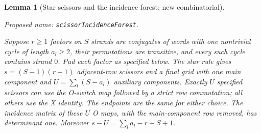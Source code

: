 \documentclass[11pt,a4paper]{article}
\newtheorem{lemma}[theorem]{Lemma}
\theoremstyle{remark}
\newcommand{\formalname}[1]{\leavevmode\par\noindent\textnormal{\small Proposed name: \texttt{#1}.}\par\smallskip}
\begin{document}
\begin{lemma}[Star scissors and the incidence forest; new combinatorial]
\label{lem:scissor-forest}
\formalname{scissorIncidenceForest}
Suppose $r\ge1$ factors on $S$ strands are conjugates of words with
one nontrivial cycle of length $a_l\ge2$, their permutations are
transitive, and every such cycle contains strand $0$.  Pad each
factor as specified below.  The star rule gives
$s=(S-1)(r-1)$ adjacent-row scissors and a final grid with one main
component and $U=\sum_l(S-a_l)$ auxiliary components.  Exactly $U$
specified scissors can use the O-switch map followed by a strict
row commutation; all others use the X identity.  The endpoints
are the same for either choice.  The incidence matrix of these
$U$ O maps, with the main-component row removed, has determinant
one.  Moreover
$s-U=\sum_l a_l-r-S+1$.
\end{lemma}
\end{document}
